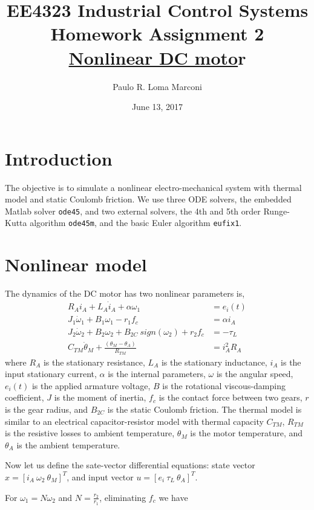\documentclass[]{article}
\title{EE4323 Industrial Control Systems\\ 
		Homework Assignment 2\\
		\underline{Nonlinear DC moto}r}
\author{Paulo R. Loma Marconi}
\date{June 13, 2017}
\begin{document}
\maketitle

\section{Introduction}
The objective is to simulate a nonlinear electro-mechanical system with thermal model and static Coulomb friction. We use three ODE solvers, the embedded Matlab solver \texttt{ode45}, and two external solvers, the 4th and 5th order Runge-Kutta algorithm \texttt{ode45m}, and the basic Euler algorithm \texttt{eufix1}.

\section{Nonlinear model}
The dynamics of the DC motor has two nonlinear parameters is, 
\begin{align}
	R_A i_A + L_A \dot{i}_A+\alpha \omega_1                             & = e_{i}(t)   \\
	J_1 \dot{\omega}_1 + B_1 \omega_1 - r_1 f_c                         & = \alpha i_A \\
	J_2 \dot{\omega}_2 + B_2 \omega_2 + B_{2C}~sign(\omega_2) + r_2 f_c & = -\tau_{L}  \\
	C_{TM} \dot{\theta}_M + \frac{(\theta_M-\theta_A)}{R_{TM}}          & = i^2_A R_A
\end{align}
where $R_A$ is the stationary resistance, $L_A$ is the stationary inductance, $i_A$ is the input stationary current, $\alpha$ is the internal parameters, $\omega$ is the angular speed, $e_i(t)$ is the applied armature voltage, $B$ is the rotational viscous-damping coefficient, $J$ is the moment of inertia, $f_c$ is the contact force between two gears, $r$ is the gear radius, and $B_{2C}$ is the static Coulomb friction. The thermal model is similar to an electrical capacitor-resistor model with thermal capacity $C_{TM}$, $R_{TM}$ is the resistive losses to ambient temperature, $\theta_M$ is the motor temperature, and $\theta_A$ is the ambient temperature. 

Now let us define the sate-vector differential equations: state vector $x = [ i_A~ \omega_2~ \theta_M ]^T $, and input vector $u = [ e_{i}~ \tau_{L}~ \theta_A ]^T$. 

For $\omega_1=N \omega_2$ and $N=\frac{r_2}{r_1}$, eliminating $f_c$ we have
\end{document}
